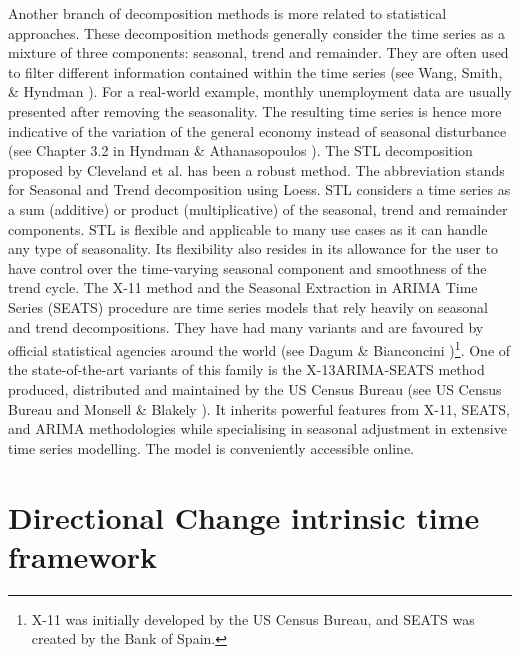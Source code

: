 Another branch of decomposition methods is more related to statistical approaches. These decomposition methods generally consider the time series as a mixture of three components: seasonal, trend and remainder. They are often used to filter different information contained within the time series (see Wang, Smith, \& Hyndman \citeyear{wang2006characteristic}). For a real-world example, monthly unemployment data are usually presented after removing the seasonality. The resulting time series is hence more indicative of the variation of the general economy instead of seasonal disturbance (see Chapter 3.2 in Hyndman \& Athanasopoulos \citeyear{forecastingprincipleandpractice}). The STL decomposition proposed by Cleveland et al. \citeyear{cleveland1990stl} has been a robust method. The abbreviation stands for Seasonal and Trend decomposition using Loess. STL considers a time series as a sum (additive) or product (multiplicative) of the seasonal, trend and remainder components. STL is flexible and applicable to many use cases as it can handle any type of seasonality. Its flexibility also resides in its allowance for the user to have control over the time-varying seasonal component and smoothness of the trend cycle. The X-11 method and the Seasonal Extraction in ARIMA Time Series (SEATS) procedure are time series models that rely heavily on seasonal and trend decompositions. They have had many variants and are favoured by official statistical agencies around the world (see Dagum \& Bianconcini \citeyear{dagum2016seasonal})\footnote{X-11 was initially developed by the US Census Bureau, and SEATS was created by the Bank of Spain.}. One of the state-of-the-art variants of this family is the X-13ARIMA-SEATS method produced, distributed and maintained by the US Census Bureau (see US Census Bureau \citeyear{x13arimaseatsmanual} and Monsell \& Blakely \citeyear{monsell2013x}). It inherits powerful features from X-11, SEATS, and ARIMA methodologies while specialising in seasonal adjustment in extensive time series modelling. The model is conveniently accessible online\footnotemark{}.

\section{Directional Change intrinsic time framework}\label{sec: DC}

